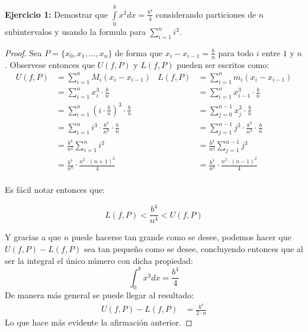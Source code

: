 \documentclass[../../main.tex]{subfiles}
\begin{document}
\question \textbf{Ejercicio 1:} Demostrar que $\int\limits_{0}^b x^3 dx = \frac{b^4}{4}$ considerando particiones de $n$
subintervalos y usando la formula para $\sum\limits_{i=1}^n i^3$.
\begin{proof}
    Sea $P = \{x_0, x_1, \dots, x_n\}$ de forma que $x_i - x_{i-1} = \frac{b}{n}$ para todo $i$ entre $1$ y $n$. Observese entonces que $U(f, P)$ y $L(f, P)$ pueden ser escritos como:
    \begin{align*}
        U(f, P) &= \sum_{i = 1}^n M_i (x_i-x_{i-1}) & L(f, P) &= \sum_{i = 1}^n m_i (x_i - x_{i-1})\\
        &= \sum_{i = 1}^n x_i^3 \cdot \frac{b}{n} & &= \sum_{i=1}^n x_{i-1}^3 \cdot \frac{b}{n}\\
        &= \sum_{i = 1}^n \left(i \cdot \frac{b}{n}\right)^3 \cdot \frac{b}{n} & &= \sum_{j = 0}^{n-1} x_j^3 \cdot \frac{b}{n}\\
        &= \sum_{i = 1}^n i^3 \cdot \frac{b^3}{n^3} \cdot \frac{b}{n} & &= \sum_{j = 1}^{n-1} j^3 \cdot \frac{b^3}{n^3} \cdot \frac{b}{n}\\
        &= \frac{b^4}{n^4} \sum_{i = 1}^n i^3 & &= \frac{b^4}{n^4} \sum_{j = 1}^{n-1} j^3\\
        &= \frac{b^4}{n^4} \cdot \frac{n^2 \cdot (n+1)^2}{4} & &= \frac{b^4}{n^4} \cdot \frac{n^2 \cdot (n-1)^2}{4}\\
    \end{align*}

    Es fácil notar entonces que:

    $$L(f, P) < \frac{b^4}{n^4} < U(f, P)$$

    Y gracias a que $n$ puede hacerse tan grande como se desee, podemos hacer que $U(f, P) - L(f, P)$ sea tan pequeño como se desee, concluyendo entonces que al ser la integral el
    único número con dicha propiedad:
    $$\int_0^b x^3 dx = \frac{b^4}{4}$$
    De manera más general se puede llegar al resultado:
    \begin{align*}
        U(f, P) - L(f, P) &= \frac{b^4}{2 \cdot n}
    \end{align*}
    Lo que hace más evidente la afirmación anterior.
\end{proof}
\end{document}
